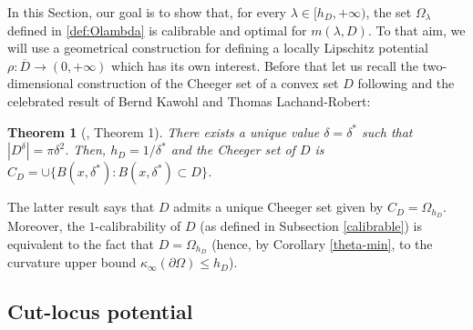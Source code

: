 \documentclass[reqno,11pt]{amsart}
\newtheorem{theorem}{Theorem}[section]
\theoremstyle{definition}
\numberwithin{equation}{section}
\def\ov{\overline}
\newcommand{\1}{{{\bf 1}\kern-0,28em\rm l}}
\def\O{\Omega}
\def\l{\lambda}
\begin{document}
\medskip
In this Section, our goal  is to show that, for every $\l\in [h_D,+\infty)$, the set $\O_\l$ defined in \eqref{def:Olambda} is calibrable and optimal for $m(\l,D)$.
To that aim, we will use a geometrical construction for defining a locally Lipschitz potential $\rho: \ov D \to (0,+\infty)$ which has its own interest. 
Before that let us recall the two-dimensional construction of  the Cheeger set of a convex set $D$ following \cite[Theorem 3.32 i)]{stredulinsky1997area} and the celebrated result of Bernd Kawohl and Thomas Lachand-Robert:
\begin{theorem}[\cite{kawohl2006characterization}, Theorem 1]\label{chaCheeger2}
There exists a unique value $\delta=\delta^*$ such that $|D^\delta| = \pi\delta^2$. Then, $h_D=1/\delta^*$ and the Cheeger set of $D$ is $C_D = \cup \{B(x,\delta^*):B(x,\delta^*) \subset D\}$.
\end{theorem}
The latter result says that $D$  admits a unique Cheeger set given by $C_D=\O_{h_D}$. Moreover,  the $1$-calibrability of $D$  (as defined in Subsection \ref{calibrable}) is equivalent to the fact that $D=\O_{h_D}$
(hence, by Corollary \ref{theta-min}, to the curvature upper bound $\kappa_\infty(\partial\O)\le h_D$). 

\subsection{Cut-locus potential}
\label{sec_cutlocus}






%
\end{document}
